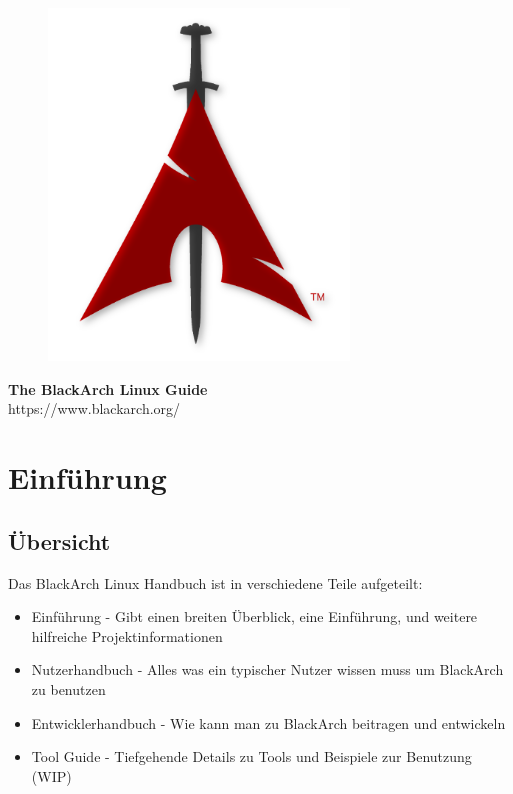 \documentclass[a4paper, oneside, 11pt]{book}
\begin{document}
\pagestyle{empty}
\begin{center}
\begin{figure}[htbp]
\centering
\vspace{0.5cm}
\includegraphics[width=8cm]{images/logo.png}
\label{fig:logo}
\end{figure}
\vspace{0.5cm}
\Huge{\textbf{The BlackArch Linux Guide}}\\
\vspace{1cm}
\Large{\color{red}https://www.blackarch.org/}\\
\vspace{0.5cm}
\end{center}
\newpage
\tableofcontents
\newpage
\pagestyle{fancy}


\chapter{Einführung}

\section{Übersicht}
Das BlackArch Linux Handbuch ist in verschiedene Teile aufgeteilt:
\begin{itemize}
\item Einführung - Gibt einen breiten Überblick, eine Einführung, und weitere hilfreiche Projektinformationen
\item Nutzerhandbuch - Alles was ein typischer Nutzer wissen muss um BlackArch zu benutzen
\item Entwicklerhandbuch - Wie kann man zu BlackArch beitragen und entwickeln
\item Tool Guide - Tiefgehende Details zu Tools und Beispiele zur Benutzung (WIP)
\end{itemize}
\end{document}
